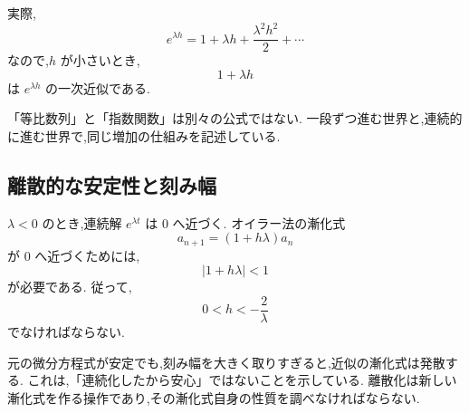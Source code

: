 実際,
\[
  e^{\lambda h}
  =1+\lambda h+\frac{\lambda^2h^2}{2}+\cdots
\]
なので,$h$ が小さいとき,
\[
  1+\lambda h
\]
は $e^{\lambda h}$ の一次近似である.

「等比数列」と「指数関数」は別々の公式ではない.
一段ずつ進む世界と,連続的に進む世界で,同じ増加の仕組みを記述している.

\subsection{離散的な安定性と刻み幅}

$\lambda<0$ のとき,連続解 $e^{\lambda t}$ は $0$ へ近づく.
オイラー法の漸化式
\[
  a_{n+1}=(1+h\lambda)a_n
\]
が $0$ へ近づくためには,
\[
  |1+h\lambda|<1
\]
が必要である.
従って,
\[
  0<h<-\frac2\lambda
\]
でなければならない.

元の微分方程式が安定でも,刻み幅を大きく取りすぎると,近似の漸化式は発散する.
これは,「連続化したから安心」ではないことを示している.
離散化は新しい漸化式を作る操作であり,その漸化式自身の性質を調べなければならない.
